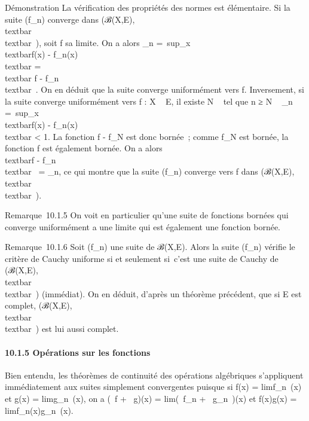 \documentclass[]{article}
\begin{document}
Démonstration La vérification des propriétés des normes est élémentaire.
Si la suite (f\_n) converge dans
(ℬ(X,E),\\textbar{} \\textbar{}\infty~), soit f
sa limite. On a alors \mu\_n =\
sup\_x\inX\\textbar{}f(x) -
f\_n(x)\\textbar{} =\\textbar{} f
- f\_n\\textbar{}\infty~. On en déduit que la suite
converge uniformément vers f. Inversement, si la suite converge
uniformément vers f : X \rightarrow~ E, il existe N \in {}~ tel que n ≥ N \rigtharrow~
\mu\_n =\
sup\_x\inX\\textbar{}f(x) -
f\_n(x)\\textbar{} \textless{} 1. La fonction f -
f\_N est donc bornée~; comme f\_N est bornée, la
fonction f est également bornée. On a alors \\textbar{}f
- f\_n\\textbar{}\infty~ = \mu\_n, ce qui montre
que la suite (f\_n) converge vers f dans
(ℬ(X,E),\\textbar{} \\textbar{}\infty~).

Remarque~10.1.5 On voit en particulier qu'une suite de fonctions bornées
qui converge uniformément a une limite qui est également une fonction
bornée.

Remarque~10.1.6 Soit (f\_n) une suite de ℬ(X,E). Alors la suite
(f\_n) vérifie le critère de Cauchy uniforme si et seulement
si~c'est une suite de Cauchy de (ℬ(X,E),\\textbar{}
\\textbar{}\infty~) (immédiat). On en déduit, d'après un
théorème précédent, que si E est complet,
(ℬ(X,E),\\textbar{} \\textbar{}\infty~) est lui
aussi complet.

\paragraph{10.1.5 Opérations sur les fonctions}

Bien entendu, les théorèmes de continuité des opérations algébriques
s'appliquent immédiatement aux suites simplement convergentes puisque si
f(x) = limf\_n~(x) et g(x)
= limg\_n~(x), on a (\alpha~f + \beta~g)(x)
= lim(\alpha~f\_n + \beta~g\_n~)(x) et
f(x)g(x) = limf\_n(x)g\_n~(x).
\end{document}
